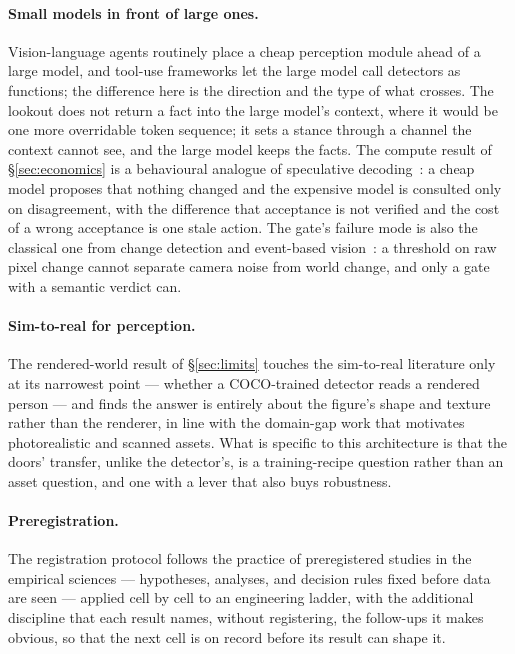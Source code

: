 \documentclass[11pt]{article}
\begin{document}
\paragraph{Small models in front of large ones.} Vision-language agents
routinely place a cheap perception module ahead of a large model, and
tool-use frameworks let the large model call detectors as functions;
the difference here is the direction and the type of what crosses. The
lookout does not return a fact into the large model's context, where it
would be one more overridable token sequence; it sets a stance through
a channel the context cannot see, and the large model keeps the facts.
The compute result of \S\ref{sec:economics} is a behavioural analogue of
speculative decoding~\cite{leviathan2023,chen2023}: a cheap model
proposes that nothing changed and the expensive model is consulted only
on disagreement, with the difference that acceptance is not verified
and the cost of a wrong acceptance is one stale action. The gate's
failure mode is also the classical one from change detection and
event-based vision~\cite{gallego2020}: a threshold on raw pixel change
cannot separate camera noise from world change, and only a gate with a
semantic verdict can.

\paragraph{Sim-to-real for perception.} The rendered-world result of
\S\ref{sec:limits} touches the sim-to-real literature only at its
narrowest point --- whether a COCO-trained detector reads a rendered
person --- and finds the answer is entirely about the figure's shape
and texture rather than the renderer, in line with the domain-gap work
that motivates photorealistic and scanned assets. What is specific to
this architecture is that the doors' transfer, unlike the detector's,
is a training-recipe question rather than an asset question, and one
with a lever that also buys robustness.

\paragraph{Preregistration.} The registration protocol follows the
practice of preregistered studies in the empirical sciences ---
hypotheses, analyses, and decision rules fixed before data are seen ---
applied cell by cell to an engineering ladder, with the additional
discipline that each result names, without registering, the follow-ups
it makes obvious, so that the next cell is on record before its result
can shape it.
\end{document}

